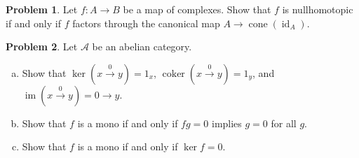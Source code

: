 \documentclass[11pt]{article}
\DeclareMathOperator{\coker}{coker}
\DeclareMathOperator{\im}{im}
\DeclareMathOperator{\id}{id}
\DeclareMathOperator{\cone}{cone}
\theoremstyle{definition}
\newtheorem{problem}{Problem}
\begin{document}
\vfill


\begin{problem}
	Let $f\!: A \to B$ be a map of complexes. Show that $f$ is nullhomotopic if and only if $f$ factors through the canonical map $A \to \cone(\id_A)$.
\end{problem}

\vfill


\begin{problem} Let $\mathcal{A}$ be an abelian category.
	\begin{enumerate}[a)]
		\item Show that $\ker(x \xrightarrow{\,0\,} y) = 1_x$,  $\coker(x \xrightarrow{\,0\,} y) = 1_y$, and $\im(x \xrightarrow{0} y) = 0 \longrightarrow y$.
		\item Show that $f$ is a mono if and only if $fg = 0$ implies $g = 0$ for all $g$.
		\item Show that $f$ is a mono if and only if $\ker f = 0$.
	\end{enumerate}
\end{problem}
\end{document}
